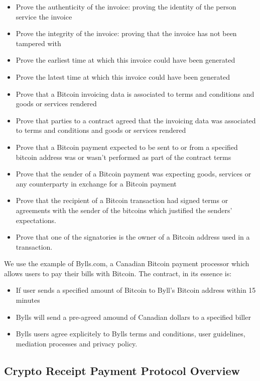 \begin{itemize}
\item Prove the authenticity of the invoice: proving the identity of the person service the invoice
\item Prove the integrity of the invoice: proving that the invoice has not been tampered with 
\item Prove the earliest time at which this invoice could have been generated
\item Prove the latest time at which this invoice could have been generated
\item Prove that a Bitcoin invoicing data is associated to terms and conditions and goods or services rendered
\item Prove that parties to a contract agreed that the invoicing data was associated to terms and conditions and goods or services rendered
\item Prove that a Bitcoin payment expected to be sent to or from a specified bitcoin address was or wasn’t performed as part of the contract terms
\item Prove that the sender of a Bitcoin payment was expecting goods, services or any counterparty in exchange for a Bitcoin payment
\item Prove that the recipient of a Bitcoin transaction had signed terms or agreements with the sender of the bitcoins which justified the senders’ expectations.
\item Prove that one of the signatories is the owner of a Bitcoin address used in a transaction.

\end{itemize}


We use the example of Bylls.com, a Canadian Bitcoin payment processor which allows users to pay their bills with Bitcoin. The contract, in its essence is:

\begin{itemize}
\item If user sends a specified amount of Bitcoin to Byll’s Bitcoin address within 15 minutes
\item Bylls will send a pre-agreed amound of Canadian dollars to a specified biller
\item Bylls users agree explicitely to Bylls terms and conditions, user guidelines, mediation processes and privacy policy.
\end{itemize}


\subsection{Crypto Receipt Payment Protocol Overview}

